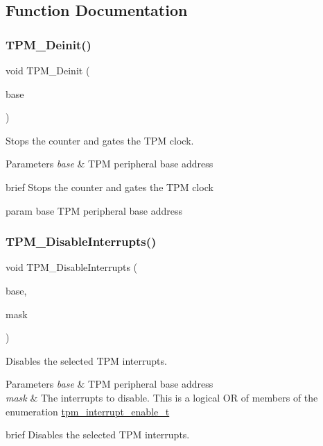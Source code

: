\subsection{Function Documentation}
\mbox{\label{group__tpm_ga8b642860d51c3c6ef94df8c313c31e91}} 
\subsubsection{\texorpdfstring{TPM\_Deinit()}{TPM\_Deinit()}}
{\footnotesize\ttfamily void T\+P\+M\+\_\+\+Deinit (\begin{DoxyParamCaption}\item[{\mbox{\hyperlink{struct_t_p_m___type}{T\+P\+M\+\_\+\+Type}} $\ast$}]{base }\end{DoxyParamCaption})}



Stops the counter and gates the T\+PM clock. 


\begin{DoxyParams}{Parameters}
{\em base} & T\+PM peripheral base address\\
\hline
\end{DoxyParams}
brief Stops the counter and gates the T\+PM clock

param base T\+PM peripheral base address \mbox{\label{group__tpm_ga254be07975c63ee2983421df1d2f0d40}} 
\subsubsection{\texorpdfstring{TPM\_DisableInterrupts()}{TPM\_DisableInterrupts()}}
{\footnotesize\ttfamily void T\+P\+M\+\_\+\+Disable\+Interrupts (\begin{DoxyParamCaption}\item[{\mbox{\hyperlink{struct_t_p_m___type}{T\+P\+M\+\_\+\+Type}} $\ast$}]{base,  }\item[{uint32\+\_\+t}]{mask }\end{DoxyParamCaption})}



Disables the selected T\+PM interrupts. 


\begin{DoxyParams}{Parameters}
{\em base} & T\+PM peripheral base address \\
\hline
{\em mask} & The interrupts to disable. This is a logical OR of members of the enumeration \mbox{\hyperlink{group__tpm_ga95c8edaff8d8b474bf4796b16413cc16}{tpm\+\_\+interrupt\+\_\+enable\+\_\+t}}\\
\hline
\end{DoxyParams}
brief Disables the selected T\+PM interrupts.

